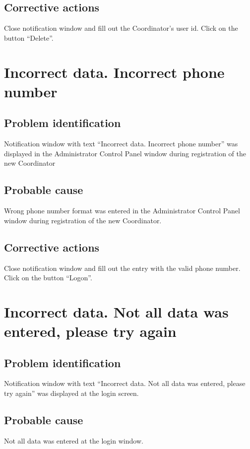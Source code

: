 \subsection{Corrective actions}
Close notification window and fill out the Coordinator's user id. Click on the
button ``Delete''.


\section{Incorrect data. Incorrect phone number}

\subsection{Problem identification}
Notification window with text ``Incorrect data. Incorrect phone number''
was displayed in the Administrator Control Panel window during registration of
the new Coordinator

\subsection{Probable cause}
Wrong phone number format was entered in the Administrator Control Panel window
during registration of the new Coordinator.

\subsection{Corrective actions}
Close notification window and fill out the entry with the valid phone number.
Click on the button ``Logon''.


\section{Incorrect data. Not all data was entered, please try again}

\subsection{Problem identification}
Notification window with text ``Incorrect data. Not all data was entered, please
try again'' was displayed at the login screen.

\subsection{Probable cause}
Not all data was entered at the login window.


